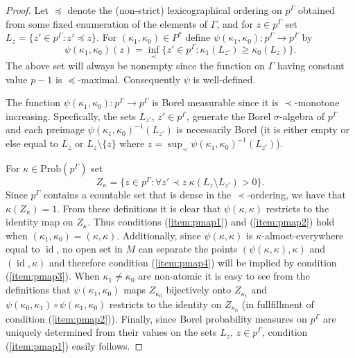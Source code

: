 \documentclass[12pt]{amsart}
\theoremstyle{definition}
\DeclareMathOperator{\id}{id}
\newcommand{\Prob}{\mathrm{Prob}}
\begin{document}
\begin{proof}
	Let $\preceq$ denote the (non-strict) lexicographical ordering on $p^\Gamma$ obtained from some fixed enumeration of the elements of $\Gamma$, and for $z \in p^\Gamma$ set $L_z = \{z' \in p^\Gamma : z' \preceq z\}$. For $(\kappa_1, \kappa_0) \in P^*$ define $\psi(\kappa_1, \kappa_0) : p^\Gamma \rightarrow p^\Gamma$ by
	\[\psi(\kappa_1, \kappa_0)(z) = \inf_\prec \{z' \in p^\Gamma : \kappa_1(L_{z'}) \geq \kappa_0(L_z)\}.\]
	The above set will always be nonempty since the function on $\Gamma$ having constant value $p-1$ is $\preceq$-maximal. Consequently $\psi$ is well-defined.
	
	The function $\psi(\kappa_1, \kappa_0) : p^\Gamma \rightarrow p^\Gamma$ is Borel measurable since it is $\prec$-monotone increasing. Specfically, the sets $L_{z'}$, $z' \in p^\Gamma$, generate the Borel $\sigma$-algebra of $p^\Gamma$ and each preimage $\psi(\kappa_1,\kappa_0)^{-1}(L_{z'})$ is necessarily Borel (it is either empty or else equal to $L_z$ or $L_z \setminus \{z\}$ where $z = \sup_\prec \psi(\kappa_1,\kappa_0)^{-1}(L_{z'})$).
	
	For $\kappa \in \Prob(p^\Gamma)$ set
	\[Z_\kappa = \{z \in p^\Gamma : \forall z' \prec z \ \kappa(L_z \setminus L_{z'}) > 0\}.\]
	Since $p^\Gamma$ contains a countable set that is dense in the $\prec$-ordering, we have that $\kappa(Z_\kappa) = 1$. From these definitions it is clear that $\psi(\kappa, \kappa)$ restricts to the identity map on $Z_\kappa$. Thus conditions (\ref{item:pmap1}) and (\ref{item:pmap2}) hold when $(\kappa_1, \kappa_0) = (\kappa, \kappa)$. Additionally, since $\psi(\kappa,\kappa)$ is $\kappa$-almost-everywhere equal to $\id$, no open set in $M$ can separate the points $(\psi(\kappa,\kappa), \kappa)$ and $(\id, \kappa)$ and therefore condition (\ref{item:pmap4}) will be implied by condition (\ref{item:pmap3}). When $\kappa_1 \neq \kappa_0$ are non-atomic it is easy to see from the definitions that $\psi(\kappa_1, \kappa_0)$ maps $Z_{\kappa_0}$ bijectively onto $Z_{\kappa_1}$ and $\psi(\kappa_0, \kappa_1) \circ \psi(\kappa_1, \kappa_0)$ restricts to the identity on $Z_{\kappa_0}$ (in fullfillment of condition (\ref{item:pmap2})). Finally, since Borel probability measures on $p^\Gamma$ are uniquely determined from their values on the sets $L_z$, $z \in p^\Gamma$, condition (\ref{item:pmap1}) easily follows.
	

\end{proof}
\end{document}
